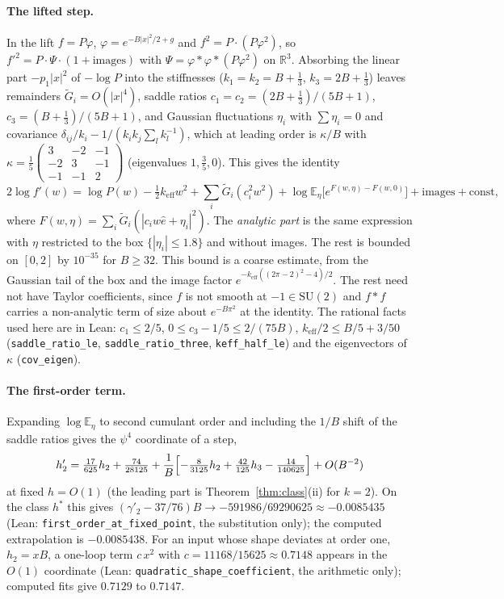 \documentclass[11pt,a4paper]{article}
\theoremstyle{definition}
\theoremstyle{remark}
\newcommand{\E}{\mathbb{E}}
\newcommand{\R}{\mathbb{R}}
\newcommand{\SU}{\mathrm{SU}(2)}
\newcommand{\code}[1]{\texttt{#1}}
\begin{document}
\paragraph{The lifted step.}
In the lift $f=P\varphi$, $\varphi=e^{-B|x|^2/2+g}$ and $f^2=P\cdot(P\varphi^2)$, so $f'^2=P\cdot\Psi\cdot(1+\text{images})$ with $\Psi=\varphi*\varphi*(P\varphi^2)$ on $\R^3$.
Absorbing the linear part $-p_1|x|^2$ of $-\log P$ into the stiffnesses ($k_1=k_2=B+\tfrac13$, $k_3=2B+\tfrac13$) leaves remainders $\tilde G_i=O(|x|^4)$, saddle ratios $c_1=c_2=(2B+\tfrac13)/(5B+1)$, $c_3=(B+\tfrac13)/(5B+1)$, and Gaussian fluctuations $\eta_i$ with $\sum\eta_i=0$ and covariance $\delta_{ij}/k_i-1/(k_ik_j\sum_l k_l^{-1})$, which at leading order is $\kappa/B$ with $\kappa=\tfrac15\left(\begin{smallmatrix}3&-2&-1\\-2&3&-1\\-1&-1&2\end{smallmatrix}\right)$ (eigenvalues $1,\tfrac35,0$).
This gives the identity
\[
2\log f'(w)=\log P(w)-\tfrac12k_{\mathrm{eff}}w^2+\sum_i\tilde G_i(c_i^2w^2)+\log\E_\eta\bigl[e^{F(w,\eta)-F(w,0)}\bigr]+\text{images}+\mathrm{const},
\]
where $F(w,\eta)=\sum_i\tilde G_i(|c_iw\hat e+\eta_i|^2)$.
The \emph{analytic part} is the same expression with $\eta$ restricted to the box $\{|\eta_i|\le1.8\}$ and without images.
The rest is bounded on $[0,2]$ by $10^{-35}$ for $B\ge32$.
This bound is a coarse estimate, from the Gaussian tail of the box and the image factor $e^{-k_{\mathrm{eff}}((2\pi-2)^2-4)/2}$.
The rest need not have Taylor coefficients, since $f$ is not smooth at $-1\in\SU$ and $f*f$ carries a non-analytic term of size about $e^{-B\pi^2}$ at the identity.
The rational facts used here are in Lean: $c_1\le2/5$, $0\le c_3-1/5\le2/(75B)$, $k_{\mathrm{eff}}/2\le B/5+3/50$ (\code{saddle\_ratio\_le}, \code{saddle\_ratio\_three}, \code{keff\_half\_le}) and the eigenvectors of $\kappa$ (\code{cov\_eigen}).

\paragraph{The first-order term.}
Expanding $\log\E_\eta$ to second cumulant order and including the $1/B$ shift of the saddle ratios gives the $\psi^4$ coordinate of a step,
\[
h_2'=\tfrac{17}{625}h_2+\tfrac{74}{28125}+\frac1B\Bigl[-\tfrac{8}{3125}h_2+\tfrac{42}{125}h_3-\tfrac{14}{140625}\Bigr]+O(B^{-2})
\]
at fixed $h=O(1)$ (the leading part is Theorem~\ref{thm:class}(ii) for $k=2$).
On the class $h^*$ this gives $(\gamma'_2-37/76)B\to-591986/69290625\approx-0.0085435$ (Lean: \code{first\_order\_at\_fixed\_point}, the substitution only); the computed extrapolation is $-0.0085438$.
For an input whose shape deviates at order one, $h_2=xB$, a one-loop term $c\,x^2$ with $c=11168/15625\approx0.7148$ appears in the $O(1)$ coordinate (Lean: \code{quadratic\_shape\_coefficient}, the arithmetic only); computed fits give $0.7129$ to $0.7147$.
\end{document}
